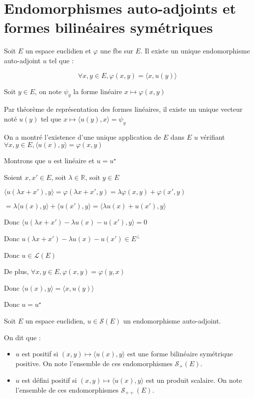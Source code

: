 \documentclass[a4paper,12pt]{book}
\newcommand{\Def}[2]{\begin{tcolorbox}[sharp corners, colback=white,colframe=blue!90!black!75, title=Définition : #1]#2\end{tcolorbox}}
\newcommand{\Thr}[2]{\begin{tcolorbox}[sharp corners, colback=white,colframe=red!90!black!75, title=Théorème : #1]#2\end{tcolorbox}}
\newcommand{\Pre}[1]{\begin{tcolorbox}[sharp corners, colback=white,colframe=green!60!green!30!black!75, title=Preuve]#1\end{tcolorbox}}
\def\R{\mathbb{R}}
\begin{document}
\section{Endomorphismes auto-adjoints et formes bilinéaires symétriques}
\Thr{}{Soit $E$ un espace euclidien et $\varphi$ une fbs sur $E$. Il existe un unique endomorphisme auto-adjoint $u$ tel que :
\par $$\forall x,y\in E, \varphi(x,y) = \langle x, u(y)\rangle$$}
\Pre{Soit $y\in E$, on note $\psi_y$ la forme linéaire $x\mapsto \varphi(x,y)$
\par Par théorème de représentation des formes linéaires, il existe un unique vecteur noté $u(y)$ tel que $x\mapsto \langle u(y), x\rangle =\psi_y$
\par On a montré l'existence d'une unique application de $E$ dans $E$ $u$ vérifiant $\forall x,y\in E, \langle u(x), y\rangle =\varphi(x,y)$
\par Montrons que $u$ est linéaire et $u=u^\star$
\par Soient $x, x'\in E$, soit $\lambda\in\R$, soit $y\in E$
\par $\langle u(\lambda x + x'), y\rangle = \varphi(\lambda x +x',y) = \lambda \varphi(x,y)+\varphi(x', y)$
\par $ = \lambda \langle u(x), y\rangle + \langle u(x'), y\rangle = \langle \lambda u(x)+u(x'),y\rangle$
\par Donc $\langle u(\lambda x+x')-\lambda u(x)-u(x'), y\rangle=0$
\par Donc $u(\lambda x+x')-\lambda u(x) - u(x')\in E^\perp$
\par Donc $u\in\mathcal{L}(E)$
\par De plus, $\forall x,y\in E, \varphi(x,y)=\varphi(y,x)$
\par Donc $\langle u(x), y\rangle =\langle x, u(y)\rangle$
\par Donc $u=u^\star$}
\Def{}{Soit $E$ un espace euclidien, $u\in\mathcal{S}(E)$ un endomorphisme auto-adjoint.
\par On dit que :\begin{itemize}
\item $u$ est positif si $(x,y)\mapsto \langle u(x),y\rangle$ est une forme bilinéaire symétrique positive. On note l'ensemble de ces endomorphismes $\mathcal{S}_+(E)$.
\item $u$ est défini positif si $(x,y)\mapsto \langle u(x), y\rangle$ est un produit scalaire. On note l'ensemble de ces endomorphismes $\mathcal{S}_{++}(E)$.
\end{itemize}}
\end{document}
